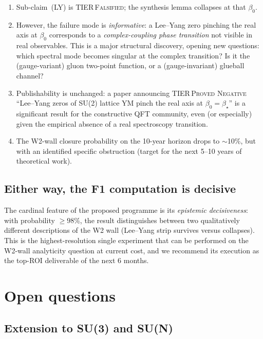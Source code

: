 \documentclass[11pt,a4paper]{article}
\theoremstyle{definition}
\theoremstyle{remark}
\begin{document}
\begin{enumerate}
\item Sub-claim~(LY) is TIER\,\textsc{Falsified}; the synthesis
lemma collapses at that $\beta_0$.

\item However, the failure mode is \emph{informative}: a Lee--Yang
zero pinching the real axis at $\beta_0$ corresponds to a
\emph{complex-coupling phase transition} not visible in real
observables. This is a major structural discovery, opening new
questions: which spectral mode becomes singular at the complex
transition? Is it the (gauge-variant) gluon two-point function,
or a (gauge-invariant) glueball channel?

\item Publishability is unchanged: a paper announcing
TIER\,\textsc{Proved Negative} ``Lee--Yang zeros of SU(2) lattice
YM pinch the real axis at $\beta_0 = \beta_\star$'' is a
significant result for the constructive QFT community, even (or
especially) given the empirical absence of a real spectroscopy
transition.

\item The W2-wall closure probability on the 10-year horizon
drops to $\sim$10\%, but with an identified specific
obstruction (target for the next 5--10 years of theoretical
work).
\end{enumerate}

\subsection{Either way, the F1 computation is decisive}

The cardinal feature of the proposed programme is its
\emph{epistemic decisiveness}: with probability $\ge 98\%$, the
result distinguishes between two qualitatively different
descriptions of the W2 wall (Lee--Yang strip survives versus
collapses). This is the highest-resolution single experiment
that can be performed on the W2-wall analyticity question at
current cost, and we recommend its execution as the top-ROI
deliverable of the next 6 months.

\medskip

\section{Open questions}\label{sec:open}

\subsection{Extension to SU(3) and SU(N)}
\end{document}
